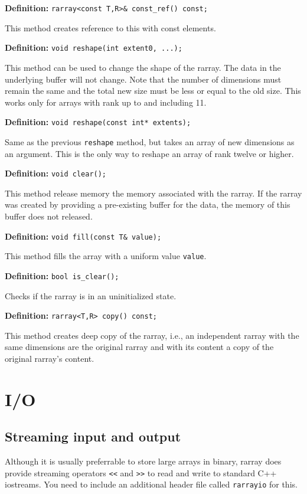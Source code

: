 \documentclass[11pt,twoside]{article}
\begin{document}
\noindent\textbf{Definition:} \texttt{rarray{\tt<}const T,R{\tt>}\& const\_ref() const;}

This method creates reference to this with const elements.

\noindent\textbf{Definition:} \texttt{void reshape(int extent0, ...);}

This method can be used to change the shape of the rarray. The data in the underlying buffer will not change. Note that the number of dimensions must remain the same and the total new size must be less or equal to the old size.  This works only for arrays with rank up to and including 11. 

\noindent\textbf{Definition:} \texttt{void reshape(const int* extents);}

Same as the previous \texttt{reshape} method, but takes an array of new dimensions as an argument.  This is the only way to reshape an array of rank twelve or higher.

\noindent\textbf{Definition:} \texttt{void clear();}

This method release memory the memory associated with the rarray. If the rarray was created by providing a pre-existing buffer for the data, the memory of this buffer does not released.

\noindent\textbf{Definition:} \texttt{void fill(const T\& value);}

This method fills the array with a uniform value \texttt{value}.

\noindent\textbf{Definition:} \texttt{bool is\_clear();}

Checks if the rarray is in an uninitialized state.

\noindent\textbf{Definition:} \texttt{rarray{\tt<}T,R{\tt>} copy() const;}

This method creates deep copy of the rarray, i.e., an independent rarray with the same dimensions are the original rarray and with its content a copy of the original rarray's content.

\section{I/O}

\subsection{Streaming input and output}

Although it is usually preferrable to store large arrays in binary, rarray does provide streaming operators \texttt{<<} and \texttt{>>} to read and write to standard C++ iostreams.  You need to include an additional header file called \texttt{rarrayio} for this.
\end{document}
